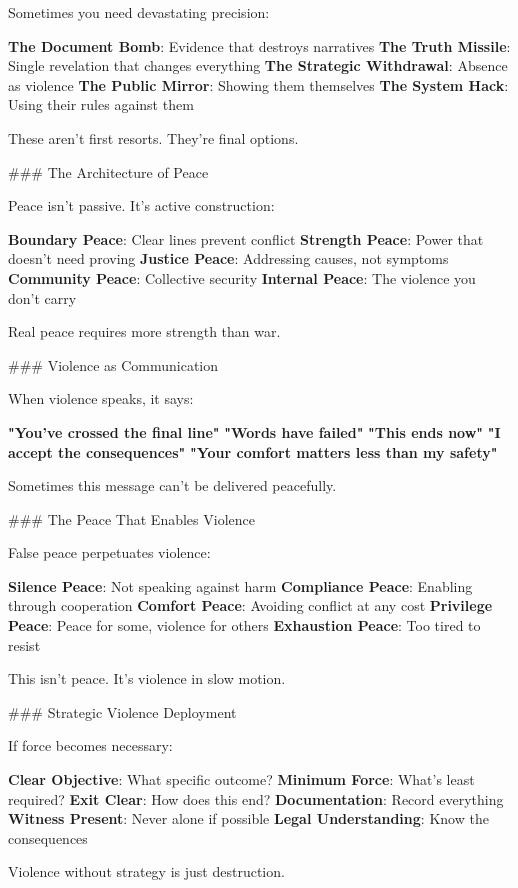 \documentclass[12pt]{book}
\begin{document}
Sometimes you need devastating precision:

\textbf{The Document Bomb}: Evidence that destroys narratives
\textbf{The Truth Missile}: Single revelation that changes everything
\textbf{The Strategic Withdrawal}: Absence as violence
\textbf{The Public Mirror}: Showing them themselves
\textbf{The System Hack}: Using their rules against them

These aren't first resorts. They're final options.

\#\#\# The Architecture of Peace

Peace isn't passive. It's active construction:

\textbf{Boundary Peace}: Clear lines prevent conflict
\textbf{Strength Peace}: Power that doesn't need proving
\textbf{Justice Peace}: Addressing causes, not symptoms
\textbf{Community Peace}: Collective security
\textbf{Internal Peace}: The violence you don't carry

Real peace requires more strength than war.

\#\#\# Violence as Communication

When violence speaks, it says:

\textbf{"You've crossed the final line"}
\textbf{"Words have failed"}
\textbf{"This ends now"}
\textbf{"I accept the consequences"}
\textbf{"Your comfort matters less than my safety"}

Sometimes this message can't be delivered peacefully.

\#\#\# The Peace That Enables Violence

False peace perpetuates violence:

\textbf{Silence Peace}: Not speaking against harm
\textbf{Compliance Peace}: Enabling through cooperation
\textbf{Comfort Peace}: Avoiding conflict at any cost
\textbf{Privilege Peace}: Peace for some, violence for others
\textbf{Exhaustion Peace}: Too tired to resist

This isn't peace. It's violence in slow motion.

\#\#\# Strategic Violence Deployment

If force becomes necessary:

\textbf{Clear Objective}: What specific outcome?
\textbf{Minimum Force}: What's least required?
\textbf{Exit Clear}: How does this end?
\textbf{Documentation}: Record everything
\textbf{Witness Present}: Never alone if possible
\textbf{Legal Understanding}: Know the consequences

Violence without strategy is just destruction.
\end{document}
